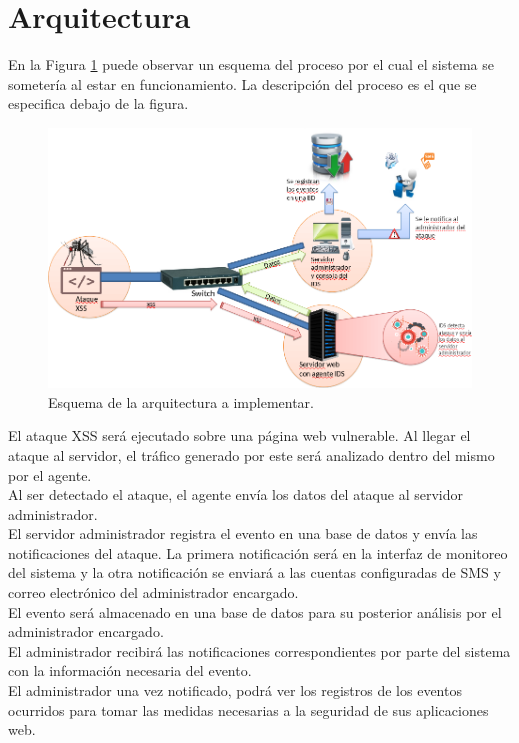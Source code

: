 \section{Arquitectura}

En la Figura \ref{fig:arqui_IDS} puede observar un esquema del proceso por el cual el sistema se sometería al estar en funcionamiento. La descripción del proceso es el que se especifica debajo de la figura.\\


\begin{figure}
	\centering
	\includegraphics[scale=.6]{images/arquitectura_IDS}
	\caption{Esquema de la arquitectura a implementar.}
	\label{fig:arqui_IDS}
\end{figure}


El ataque XSS será ejecutado sobre una página web vulnerable. Al llegar el ataque al servidor, el tráfico generado por este será analizado dentro del mismo por el agente.\\

Al ser detectado el ataque, el agente envía los datos del ataque al servidor administrador.\\

El servidor administrador registra el evento en una base de datos y envía las notificaciones del ataque. La primera notificación será en la interfaz de monitoreo del sistema y la otra notificación se enviará a las cuentas configuradas de SMS y correo electrónico del administrador encargado.\\

El evento será almacenado en una base de datos para su posterior análisis por el administrador encargado.\\

El administrador recibirá las notificaciones correspondientes por parte del sistema con la información necesaria del evento.\\

El administrador una vez notificado, podrá ver los registros de los eventos ocurridos para tomar las medidas necesarias a la seguridad de sus aplicaciones web.\\

